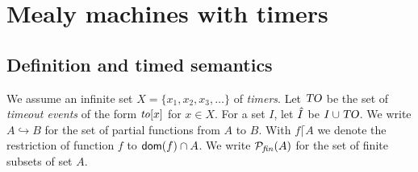 \section{Mealy machines with timers}

\subsection{Definition and timed semantics}
We assume an infinite set $X = \{ x_1, x_2, x_3,\ldots \}$ of {\em timers}.
Let $\mbox{\sl TO}$ be the set of {\em timeout events} of the form
$\mathit{to}[x]$ for $x \in X$.
For a set $I$, let $\hat{I}$ be $I \cup \mbox{\sl TO}$.
%
We write $A \hookrightarrow B$ for the set of partial functions from $A$ to $B$.
With $f \lceil A$ we denote the restriction of function $f$ to ${\textsf{dom}}(f) \cap A$.
We write ${\cal{P}}_{\mathit{fin}}(A)$ for the set of finite subsets of set $A$.

